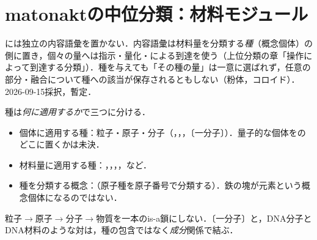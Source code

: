 \documentclass[../../main-detail.tex]{subfiles}
\begin{document}
\section{matonaktの中位分類：材料モジュール}
には独立の内容語彙を置かない．内容語彙は材料量を分類する\emph{種}（概念個体）の側に置き，個々の量へは指示・量化・による到達を使う（上位分類の章「操作によって到達する分類」）．種を与えても「その種の量」は一意に選ばれず，任意の部分・融合について種への該当が保存されるともしない（粉体，コロイド）．2026-09-15採択，暫定．

種は\emph{何に適用するか}で三つに分ける．
\begin{itemize}
  \item 個体に適用する種：粒子・原子・分子（，，，〔一分子〕）．量子的な個体をのどこに置くかは未決．
  \item 材料量に適用する種：，，，，など．
  \item 種を分類する概念：（原子種を原子番号で分類する）．鉄の塊が元素という概念個体になるのではない．
\end{itemize}
粒子$\to$原子$\to$分子$\to$物質を一本のis-a鎖にしない．〔一分子〕と，DNA分子とDNA材料のような対は，種の包含ではなく\emph{成分}関係で結ぶ．
\end{document}
